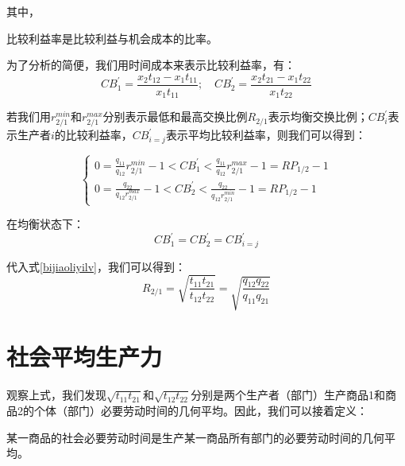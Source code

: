 其中，
\begin{definition}
    比较利益率是比较利益与机会成本的比率\cite[65]{CaiJiMingCongXiaYiJieZhiLunDaoGuangYiJieZhiLunXiuDingBan2022}。
\end{definition}

为了分析的简便，我们用时间成本来表示比较利益率，有：
\begin{equation}
    \label{bijiaoliyilv}
    \mathit{CB}^{\prime}_1 = \frac{x_2 t_{12} - x_1 t_{11}}{x_1 t_{11}}; \quad \mathit{CB}^{\prime}_2 = \frac{x_2 t_{21} - x_1 t_{22}}{x_1 t_{22}}
\end{equation}

若我们用$r^{\mathit{min}}_{2/1}$和$r^{\mathit{max}}_{2/1}$分别表示最低和最高交换比例$\mathit{R}_{2/1}$表示均衡交换比例；$\mathit{CB}^{\prime}_i$表示生产者$i$的比较利益率，$\mathit{CB}^{\prime}_{i=j}$表示平均比较利益率，则我们可以得到\cite[66]{CaiJiMingCongXiaYiJieZhiLunDaoGuangYiJieZhiLunXiuDingBan2022}：

\begin{equation}
    \begin{cases}
        0 = \frac{q_{11}}{q_{12}}r^{\mathit{min}}_{2/1} - 1 < \mathit{CB}^{\prime}_1 < \frac{q_{11}}{q_{12}}r^{\mathit{max}}_{2/1} - 1 = \mathit{RP}_{1/2} - 1 \\
        0 = \frac{q_{22}}{q_{12}r^{\mathit{max}}_{2/1}} - 1 < \mathit{CB}^{\prime}_2 < \frac{q_{22}}{q_{12}r^{\mathit{min}}_{2/1}} - 1 = \mathit{RP}_{1/2} - 1
    \end{cases}
\end{equation}

在均衡状态下：
\begin{equation}
    \mathit{CB}^{\prime}_1 = \mathit{CB}^{\prime}_2 = \mathit{CB}^{\prime}_{i=j}
\end{equation}

代入式\ref{bijiaoliyilv}，我们可以得到：
\begin{equation}
    \label{junhengjiaohuanbili}
    \mathit{R}_{2/1} = \sqrt{\frac{t_{11}t_{21}}{t_{12}t_{22}}} = \sqrt{\frac{q_{12}q_{22}}{q_{11}q_{21}}}
\end{equation}

\section{社会平均生产力}

观察上式，我们发现$\sqrt{t_{11}t_{21}}$和$\sqrt{t_{12}t_{22}}$分别是两个生产者（部门）生产商品1和商品2的个体（部门）必要劳动时间的几何平均。因此，我们可以接着定义：
\begin{definition}
    某一商品的社会必要劳动时间是生产某一商品所有部门的必要劳动时间的几何平均\cite[260]{CaiJiMingCongGuDianZhengZhiJingJiXueDaoZhongGuoTeSeSheHuiZhuYiZhengZhiJingJiXueJiYuZhongGuoShiJiaoDeZhengZhiJingJiXueYanBianShangCe2023}。
\end{definition}


